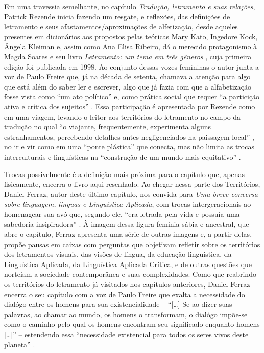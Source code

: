 \documentclass[portuguese]{textolivre}
\begin{document}
Em uma travessia semelhante, no capítulo \textit{Tradução, letramento e suas relações}, Patrick Rezende inicia fazendo um resgate, e reflexões, das definições de letramento e seus afastamentos/aproximações de alfetização, desde aqueles presentes em dicionários aos propostos pelas teóricas Mary Kato, Ingedore Kock, Ângela Kleiman e, assim como Ana Elisa Ribeiro, dá o merecido protagonismo à Magda Soares e seu livro \textit{Letramento: um tema em três gêneros} \cite{soares2025letramento}, cuja primeira edição foi publicada em 1998. Ao conjunto dessas vozes femininas o autor junta a voz de Paulo Freire que, já na década de setenta, chamava a atenção para algo que está além do saber ler e escrever, algo que já fazia com que a alfabetização fosse vista como “um ato político” \cite[p. 70]{freire1978alfabetizacao} e, como prática social que requer “a particição ativa e crítica dos sujeitos” \cite[p. 94]{rezende2024traducao}.  Essa participação é apresentada por Rezende como em uma viagem, levando o leitor aos territórios do letramento no campo da tradução no qual “o viajante, frequentemente, experimenta alguns estranhamentos, percebendo detalhes antes negligenciados na paissagem local” \cite[p. 97]{rezende2014ponte}, no ir e vir como em uma “ponte plástica” \cite[p. 97]{rezende2014ponte} que conecta, mas não limita as trocas interculturais e linguísticas na “construção de um mundo mais equitativo” \cite[p. 106]{rezende2014ponte}.

Trocas possivelmente é a definição mais próxima para o capítulo que, apenas fisicamente, encerra o livro aqui resenhado. Ao chegar nessa parte dos Territórios, Daniel Ferraz, autor deste último capítulo, nos convida para \textit{Uma breve conversa sobre linguagem, línguas e Linguística Aplicada}, com trocas intergeracionais ao homenagear sua avó que, segundo ele, “era letrada pela vida e possuía uma sabedoria insipiradora” \cite[p. 109]{feraz2024linguagem}.  À imagem dessa figura feminia sábia e ancestral, que abre o capítulo, Ferraz apresenta uma série de outras imagens e, a partir delas, propõe pausas em caixas com perguntas que objetivam refletir sobre os territórios dos letramentos visuais, das visões de língua, da educação linguística, da Linguística Aplicada, da Linguística Aplicada Crítica, e de outras questões que norteiam a sociedade contemporânea e suas complexidades. Como que reabrindo os territórios do letramento já visitados nos capítulos anteriores, Daniel Ferraz encerra o seu capítulo com a voz de Paulo Freire que exalta a necessidade do dialógo entre os homens para sua existencialidade – “[…] Se ao dizer suas palavras, ao chamar ao mundo, os homens o transformam, o dialógo impõe-se como o caminho pelo qual os homens encontram seu significado enquanto homens […]” \cite[p. 42]{freire1980educacao} – estendendo essa “necessidade existencial para todos os seres vivos deste planeta” \cite[p. 121]{feraz2024linguagem}. 
\end{document}
